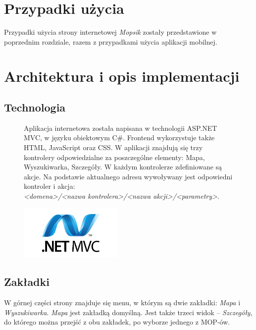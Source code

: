 \section{Przypadki użycia}
Przypadki użycia strony internetowej \textit{Mopsik} zostały przedstawione w poprzednim rozdziale, razem z przypadkami użycia aplikacji mobilnej.

\section{Architektura i opis implementacji}

\subsection{Technologia}
\begin{figure}[!htb]
    \centering
    \begin{minipage}{.7\textwidth}
Aplikacja internetowa została napisana w technologii ASP.NET MVC, w języku obiektowym C\#. Frontend wykorzystuje także HTML, JavaScript oraz CSS. W aplikacji znajdują się trzy kontrolery odpowiedzialne za poszczególne elementy: Mapa, Wyszukiwarka, Szczegóły. W każdym kontrolerze zdefiniowane są akcje. Na podstawie aktualnego adresu wywoływany jest odpowiedni kontroler i akcja:\\ \textit{<domena>/<nazwa kontrolera>/<nazwa akcji>/<parametry>}.
    \end{minipage}%
    \begin{minipage}{.3\textwidth}
        \centering
        \includegraphics[width=5cm]{images/mvc.png}\label{MVC_logo}
    \end{minipage}
\end{figure}

\subsection{Zakładki}
W górnej części strony znajduje się menu, w którym są dwie zakładki: \textit{Mapa} i \textit{Wyszukiwarka}. \textit{Mapa} jest zakładką domyślną. Jest także trzeci widok -- \textit{Szczegóły}, do którego można przejść z obu zakładek, po wyborze jednego z MOP-ów.
